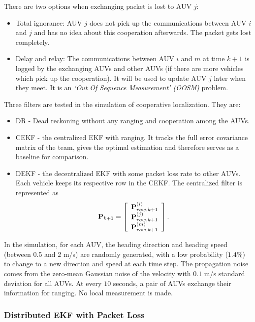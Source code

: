 There are two options when exchanging packet is lost to AUV $j$:
\begin{itemize}
  \item Total ignorance: AUV $j$ does not pick up the communications between AUV $i$ and $j$ and has no idea about this cooperation afterwards. The packet gets lost completely.
  \item Delay and relay: The communications between AUV $i$ and $m$ at time $k+1$ is logged by the exchanging AUVs and other AUVs (if there are more vehicles which pick up the cooperation). It will be used to update AUV $j$ later when they meet. It is an \textit{`Out Of Sequence Measurement' (OOSM)} problem.
\end{itemize}

Three filters are tested in the simulation of cooperative localization. They are:
\begin{itemize}
  \item DR - Dead reckoning without any ranging and cooperation among the AUVs. 
  \item CEKF - the centralized EKF with ranging. It tracks the full error covariance matrix of the team, gives the optimal estimation and therefore serves as a baseline for comparison.
  \item DEKF - the decentralized EKF with some packet loss rate to other AUVs. Each vehicle keeps its respective row in the CEKF. The centralized filter is represented as
  \begin{equation}
      {\bf P}_{k+1}=\left[
  \begin{array}{c}
     {\bf P}_{row,k+1}^{(i)} \\
     {\bf P}_{row,k+1}^{(j)} \\
     {\bf P}_{row,k+1}^{(m)} \\
  \end{array}
\right].
  \end{equation}
\end{itemize}

In the simulation, for each AUV, the heading direction and heading speed (between 0.5 and 2 m/s) are randomly generated, with a low probability ($1.4\%$) to change to a new direction and speed at each time step. The propagation noise comes from the zero-mean Gaussian noise of the velocity with $0.1$ m/s standard deviation for all AUVs. At every $10$ seconds, a pair of AUVs exchange their information for ranging. No local measurement is made.

\subsubsection{Distributed EKF with Packet Loss}

